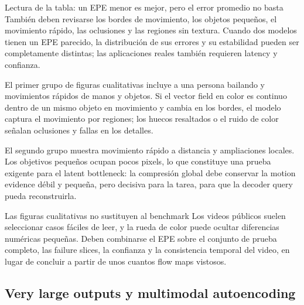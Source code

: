 \begin{knowledgebox}{Lectura de la tabla: un EPE menor es mejor, pero el error promedio no basta}
También deben revisarse los bordes de movimiento, los objetos pequeños, el movimiento rápido, las oclusiones y las regiones sin textura. Cuando dos modelos tienen un EPE parecido, la distribución de sus errores y su estabilidad pueden ser completamente distintas; las aplicaciones reales también requieren latency y confianza.
\end{knowledgebox}

El primer grupo de figuras cualitativas incluye a una persona bailando y movimientos rápidos de manos y objetos. Si el vector field en color es continuo dentro de un mismo objeto en movimiento y cambia en los bordes, el modelo captura el movimiento por regiones; los huecos resaltados o el ruido de color señalan oclusiones y fallas en los detalles.


El segundo grupo muestra movimiento rápido a distancia y ampliaciones locales. Los objetivos pequeños ocupan pocos pixels, lo que constituye una prueba exigente para el latent bottleneck: la compresión global debe conservar la motion evidence débil y pequeña, pero decisiva para la tarea, para que la decoder query pueda reconstruirla.


\begin{warningbox}{Las figuras cualitativas no sustituyen al benchmark}
Los videos públicos suelen seleccionar casos fáciles de leer, y la rueda de color puede ocultar diferencias numéricas pequeñas. Deben combinarse el EPE sobre el conjunto de prueba completo, las failure slices, la confianza y la consistencia temporal del video, en lugar de concluir a partir de unos cuantos flow maps vistosos.
\end{warningbox}

\subsection{Very large outputs y multimodal autoencoding}

